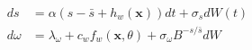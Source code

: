\begin{align}
    ds &= \alpha(s-\bar{s}+h_w(\mathbf x)) dt + \sigma_s dW(t) \\
    d\omega &= \lambda_\omega + c_w f_w(\mathbf x,\theta) + \sigma_\omega B^{-s/\bar{s}} dW
\end{align}